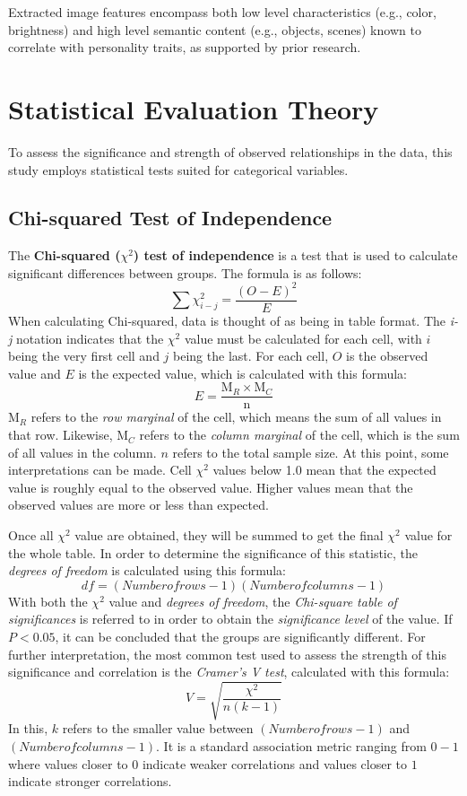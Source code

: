 Extracted image features encompass both low level characteristics (e.g., color, brightness) and high level semantic content (e.g., objects, scenes) known to correlate with personality traits, as supported by prior research.

\section{Statistical Evaluation Theory}
To assess the significance and strength of observed relationships in the data, this study employs statistical tests suited for categorical variables.

\subsection{Chi-squared Test of Independence}
The \textbf{Chi-squared ($\chi^2$) test of independence} is a test that is used to calculate significant differences between groups. The formula is as follows:
$$\sum\chi^2_{i-j} = \frac{(O - E)^2}{E}$$
When calculating Chi-squared, data is thought of as being in table format. The \textit{i-j} notation indicates that the $\chi^2$ value must be calculated for each cell, with $i$ being the very first cell and $j$ being the last. For each cell, $O$ is the observed value and $E$ is the expected value, which is calculated with this formula:
$$E = \frac{ \text{M}_R  \times  \text{M}_C }{\text{n}}$$
$\text{M}_R$ refers to the \textit{row marginal} of the cell, which means the sum of all values in that row. Likewise, $\text{M}_C$ refers to the \textit{column marginal} of the cell, which is the sum of all values in the column. $n$ refers to the total sample size. At this point, some interpretations can be made. Cell $\chi^2$ values below 1.0 mean that the expected value is roughly equal to the observed value. Higher values mean that the observed values are more or less than expected.

Once all $\chi^2$ value are obtained, they will be summed to get the final $\chi^2$ value for the whole table. In order to determine the significance of this statistic, the \textit{degrees of freedom} is calculated using this formula:
$$df = (Number of rows - 1)(Number of columns - 1)$$
With both the $\chi^2$ value and \textit{degrees of freedom}, the \textit{Chi-square table of significances} is referred to in order to obtain the \textit{significance level} of the value. If $P < 0.05$, it can be concluded that the groups are significantly different. For further interpretation, the most common test used to assess the strength of this significance and correlation is the \textit{Cramer’s V test}, calculated with this formula:
$$V = \sqrt{ \frac{ \chi^2 }{ n(k - 1) } }$$
In this, $k$ refers to the smaller value between $(Number of rows - 1)$ and $(Number of columns - 1)$. It is a standard association metric ranging from $0-1$ where values closer to $0$ indicate weaker correlations and values closer to $1$ indicate stronger correlations.

